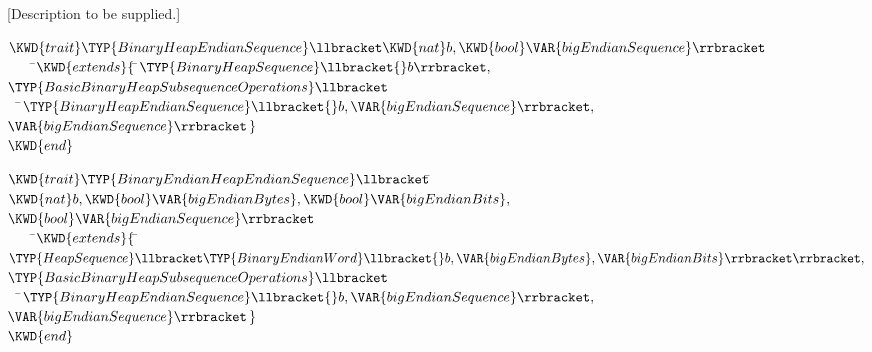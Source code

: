 [Description to be supplied.]








\begin{Fortress}
\(\KWD{trait} \TYP{BinaryHeapEndianSequence}\llbracket\KWD{nat} b, \KWD{bool} \VAR{bigEndianSequence}\rrbracket\)\\
{\tt~~~~}\pushtabs\=\+\(    \KWD{extends} \{\,\null\)\pushtabs\=\+\(\TYP{BinaryHeapSequence}\llbracket{}b\rrbracket,\)\\
\(              \TYP{BasicBinaryHeapSubsequenceOperations}\llbracket\)\\
{\tt~~}\pushtabs\=\+\(                \TYP{BinaryHeapEndianSequence}\llbracket{}b,\VAR{bigEndianSequence}\rrbracket,\)\\
\(                \VAR{bigEndianSequence}\rrbracket\,\}\)\-\-\-\\\poptabs\poptabs\poptabs
\(\KWD{end}\)
\end{Fortress}



\begin{Fortress}
\(\KWD{trait} \TYP{BinaryEndianHeapEndianSequence}\llbracket\null\)\pushtabs\=\+\(\KWD{nat} b, \KWD{bool} \VAR{bigEndianBytes}, \KWD{bool} \VAR{bigEndianBits},\)\\
\(                                      \KWD{bool} \VAR{bigEndianSequence}\rrbracket\)\-\\\poptabs
{\tt~~~~}\pushtabs\=\+\(    \KWD{extends} \{\,\null\)\pushtabs\=\+\(\TYP{HeapSequence}\llbracket\TYP{BinaryEndianWord}\llbracket{}b,\VAR{bigEndianBytes},\VAR{bigEndianBits}\rrbracket\rrbracket,\)\\
\(              \TYP{BasicBinaryHeapSubsequenceOperations}\llbracket\)\\
{\tt~~}\pushtabs\=\+\(                \TYP{BinaryHeapEndianSequence}\llbracket{}b,\VAR{bigEndianSequence}\rrbracket,\)\\
\(                \VAR{bigEndianSequence}\rrbracket\,\}\)\-\-\-\\\poptabs\poptabs\poptabs
\(\KWD{end}\)
\end{Fortress}


